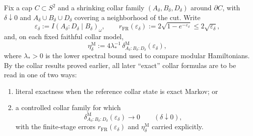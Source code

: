 \documentclass[11pt]{article}
\begin{document}
Fix a cap \(C\subset S^2\) and a shrinking collar family \((A_\delta,B_\delta,D_\delta)\) around \(\partial C\), with \(\delta\downarrow 0\) and \(A_\delta\cup B_\delta\cup D_\delta\) covering a neighborhood of the cut. Write
\[
\varepsilon_\delta:=I(A_\delta:D_\delta\mid B_\delta)_\omega,
\qquad
r_{\mathrm{FR}}(\varepsilon_\delta):=
2\sqrt{1-e^{-\varepsilon_\delta}}
\le 2\sqrt{\varepsilon_\delta},
\]
and, on each fixed faithful collar model,
\[
\eta_\delta^{\mathrm M}
:=
4\lambda_\ast^{-1}\,
\delta^{\mathrm M}_{A_\delta:B_\delta:D_\delta}(\varepsilon_\delta),
\]
where \(\lambda_\ast>0\) is the lower spectral bound used to compare modular Hamiltonians. By the collar results proved earlier, all later ``exact'' collar formulas are to be read in one of two ways:
\begin{enumerate}[leftmargin=2em]
\item literal exactness when the reference collar state is exact Markov; or
\item a controlled collar family for which
\[
\delta^{\mathrm M}_{A_\delta:B_\delta:D_\delta}(\varepsilon_\delta)\to 0
\qquad(\delta\downarrow 0),
\]
with the finite-stage errors \(r_{\mathrm{FR}}(\varepsilon_\delta)\) and \(\eta_\delta^{\mathrm M}\) carried explicitly.
\end{enumerate}
\end{document}
